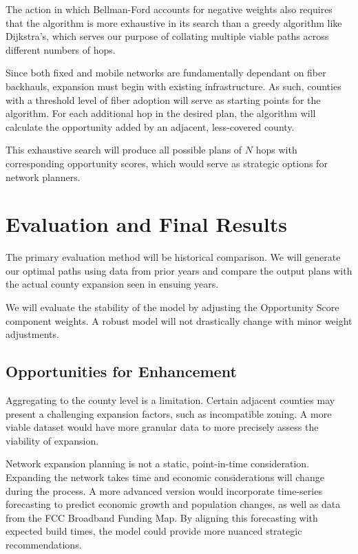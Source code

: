 \documentclass{article}
\begin{document}
The action in which Bellman-Ford accounts for negative weights also requires that the algorithm is more exhaustive in its search than a greedy algorithm like Dijkstra's, which serves our purpose of collating multiple viable paths across different numbers of hops.

Since both fixed and mobile networks are fundamentally dependant on fiber backhauls, expansion must begin with existing infrastructure. As such, counties with a threshold level of fiber adoption will serve as starting points for the algorithm. For each additional hop in the desired plan, the algorithm will calculate the opportunity added by an adjacent, less-covered county.

This exhaustive search will produce all possible plans of $N$ hops with corresponding opportunity scores, which would serve as strategic options for network planners.

\section{Evaluation and Final Results}

The primary evaluation method will be historical comparison. We will generate our optimal paths using data from prior years and compare the output plans with the actual county expansion seen in ensuing years.

We will evaluate the stability of the model by adjusting the Opportunity Score component weights. A robust model will not drastically change with minor weight adjustments.

\subsection{Opportunities for Enhancement}

Aggregating to the county level is a limitation. Certain adjacent counties may present a challenging expansion factors, such as incompatible zoning. A more viable dataset would have more granular data to more precisely assess the viability of expansion.

Network expansion planning is not a static, point-in-time consideration. Expanding the network takes time and economic considerations will change during the process. A more advanced version would incorporate time-series forecasting to predict economic growth and population changes, as well as data from the FCC Broadband Funding Map. By aligning this forecasting with expected build times, the model could provide more nuanced strategic recommendations.


\printbibliography
\end{document}
